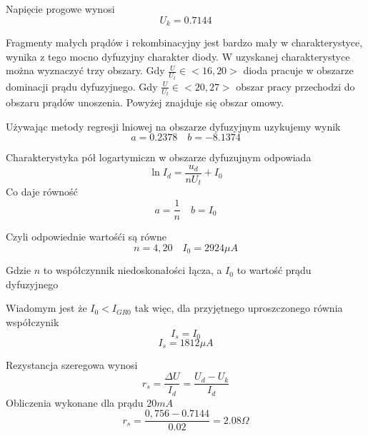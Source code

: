 \documentclass[11pt]{article}
\begin{document}
Napięcie progowe wynosi
$$ U_k =  0.7144 $$

Fragmenty małych prądów i rekombinacyjny jest bardzo mały w charakterystyce, wynika z tego mocno dyfuzyjny charakter diody.
W uzyskanej charakterystyce można wyznaczyć trzy obszary. Gdy $\frac{U}{U_t} \in <16,20>$ dioda pracuje w obszarze dominacji prądu dyfuzyjnego. Gdy $\frac{U}{U_t} \in <20,27>$ obszar pracy przechodzi do obszaru prądów unoszenia. Powyżej znajduje się obszar omowy.

Używając metody regresji lniowej na obszarze dyfuzyjnym uzykujemy wynik
$$ a =  0.2378 \quad b = -8.1374 $$

Charakterystyka pół logartymiczn w obszarze dyfuzujnym odpowiada
$$ \ln{I_d} = \frac{u_d}{nU_t} + I_0$$
Co daje równość
$$ a = \frac{1}{n} \quad b = I_0 $$

Czyli odpowiednie wartośći są równe
$$ n = 4,20 \quad I_0 = 2924 \mu A $$

Gdzie $n$ to współczynnik niedoskonałości łącza, a $I_0$ to wartość prądu dyfuzyjnego

Wiadomym jest że $ I_0 < I_{GR0} $ tak więc, dla przyjętnego uproszczonego równia współczynik 
$$ I_s = I_0 $$
$$ I_s = 1812 \mu A $$

Rezystancja szeregowa wynosi
$$ r_s = \frac{\Delta U}{I_d} = \frac{U_d - U_k}{I_d} $$
Obliczenia wykonane dla prądu $20mA$
$$ r_s = \frac{0,756-0.7144}{0.02} = 2.08 \Omega $$
\end{document}
